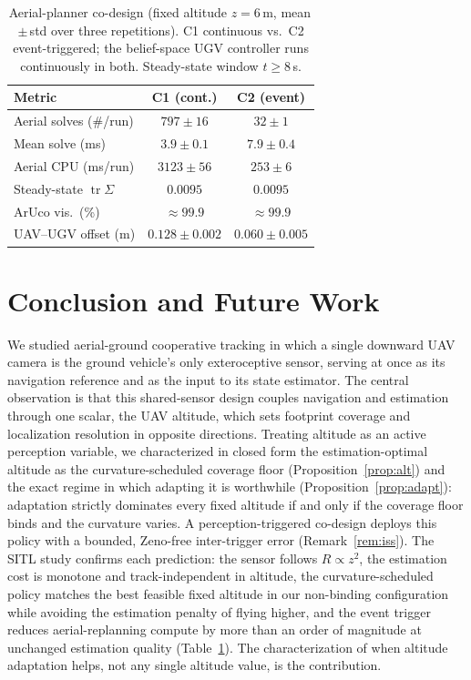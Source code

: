 \documentclass{ifacconf}
\DeclareMathOperator{\tr}{tr}
\newcommand{\RESsolvesCone}{\ensuremath{797\pm16}}\newcommand{\RESsolvesCthree}{\ensuremath{32\pm1}}
\newcommand{\RESmsCone}{\ensuremath{3.9\pm0.1}}\newcommand{\RESmsCthree}{\ensuremath{7.9\pm0.4}}
\newcommand{\REScpuCone}{\ensuremath{3123\pm56}}\newcommand{\REScpuCthree}{\ensuremath{253\pm6}}
\newcommand{\RESoffCone}{\ensuremath{0.128\pm0.002}}\newcommand{\RESoffCthree}{\ensuremath{0.060\pm0.005}}
\newcommand{\REScov}{\ensuremath{0.0095}}\newcommand{\RESsolveRed}{25}\newcommand{\REScpuRed}{12}
\begin{document}
\begin{table}[h]
\caption{Aerial-planner co-design (fixed altitude $z=6$\,m, mean\,$\pm$\,std over three repetitions). C1
continuous vs.\ C2 event-triggered; the belief-space UGV controller runs continuously in both.
Steady-state window $t\!\ge\!8$\,s.}
\label{tab:results}
\begin{center}
\footnotesize
\setlength{\tabcolsep}{3pt}
\begin{tabular}{|l|c|c|}
\hline
{\textbf{Metric}} & {\textbf{C1 (cont.)}} & {\textbf{C2 (event)}}\\
\hline
Aerial solves (\#/run) & \RESsolvesCone & \RESsolvesCthree\\
\hline
Mean solve (ms) & \RESmsCone & \RESmsCthree\\
\hline
Aerial CPU (ms/run) & \REScpuCone & \REScpuCthree\\
\hline
Steady-state $\tr\Sigma$ & \REScov & \REScov\\
\hline
ArUco vis.\ (\%) & $\approx99.9$ & $\approx99.9$\\
\hline
UAV--UGV offset (m) & \RESoffCone & \RESoffCthree\\
\hline
\end{tabular}
\end{center}
\end{table}

\section{Conclusion and Future Work}
We studied aerial-ground cooperative tracking in which a single downward UAV camera is the ground
vehicle's only exteroceptive sensor, serving at once as its navigation reference and as the input to its
state estimator. The central observation is that this shared-sensor design couples navigation and
estimation through one scalar, the UAV altitude, which sets footprint coverage and localization
resolution in opposite directions. Treating altitude as an active perception variable, we characterized
in closed form the estimation-optimal altitude as the curvature-scheduled coverage floor
(Proposition~\ref{prop:alt}) and the exact regime in which adapting it is worthwhile
(Proposition~\ref{prop:adapt}): adaptation strictly dominates every fixed altitude if and only if the
coverage floor binds and the curvature varies. A perception-triggered co-design deploys this policy with a
bounded, Zeno-free inter-trigger error (Remark~\ref{rem:iss}). The SITL study confirms each prediction: the sensor follows $R\propto z^2$,
the estimation cost is monotone and track-independent in altitude, the curvature-scheduled policy matches
the best feasible fixed altitude in our non-binding configuration while avoiding the estimation penalty
of flying higher, and the event trigger reduces aerial-replanning compute by more than an order of
magnitude at unchanged estimation quality (Table~\ref{tab:results}). The characterization of when
altitude adaptation helps, not any single altitude value, is the contribution.
\end{document}
